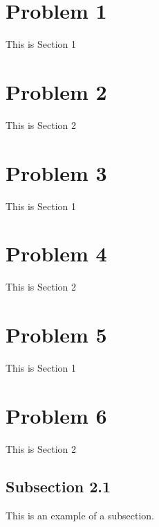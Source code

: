 \documentclass[11pt]{article}
\begin{document}
\newenvironment{note}[1]{\medskip\noindent \textbf{#1:}}%

        {\medskip}


\newenvironment{proof}{ \vspace{0.05in}\noindent{\bf Proof:}}%
        {\hspace*{\fill}$\Box$\par}
\newenvironment{proofsketch}{\noindent{\bf Proof Sketch.}}%
        {\hspace*{\fill}$\Box$\par\vspace{4mm}}
\newenvironment{proofof}[1]{\smallskip\noindent{\bf Proof of #1.}}%
        {\hspace*{\fill}$\Box$\par}

\newcommand{\etal}{{\em et al.}\ }
\newcommand{\assign}{\leftarrow}
\newcommand{\eps}{\epsilon}
\newcommand{\NP}{\textbf{NP}}

\newcommand{\opt}{\textrm{\sc OPT}}
\newcommand{\script}[1]{\mathcal{#1}}
\newcommand{\ceil}[1]{\lceil #1 \rceil}
\newcommand{\floor}[1]{\lfloor #1 \rfloor}

\newcommand{\expect}{\mbox{\bf E}}
\newcommand{\Var}{\mbox{\bf Var}}

\newcommand{\polylog}{\text{polylog}}


\setlength{\fboxrule}{.5mm}\setlength{\fboxsep}{1.2mm}
\newlength{\boxlength}\setlength{\boxlength}{\textwidth}
\addtolength{\boxlength}{-4mm}
\begin{center}\end{center}
\vspace{5mm}

\section{Problem 1}
This is Section 1

\section{Problem 2}
This is Section 2

\section{Problem 3}
This is Section 1

\section{Problem 4}
This is Section 2

\section{Problem 5}
This is Section 1

\section{Problem 6}
This is Section 2

\subsection{Subsection 2.1} 
This is an example of a subsection.
\end{document}
